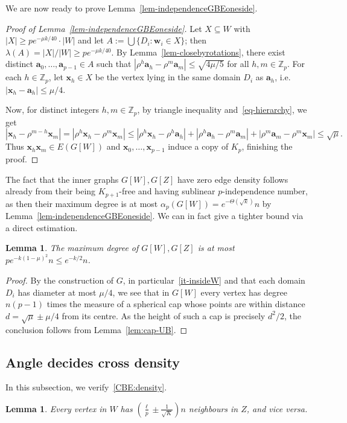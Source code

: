 \documentclass[10pt,a4paper]{article}
\newcommand{\V}[1]{\mathbold{#1}}
\newtheorem{lemma}[theorem]{Lemma}
\theoremstyle{definition}
\newcommand{\sZ}{\mathbb{Z}}
\begin{document}
We are now ready to prove Lemma~\ref{lem-independenceGBEoneside}.
\begin{proof}[Proof of Lemma~\ref{lem-independenceGBEoneside}]
Let $X\subseteq W$ with $|X|\ge pe^{-\mu k/40}\cdot|W|$
	and let $A:=\bigcup\{D_i:\V{w}_i\in X\}$; then $\lambda(A)=|X|/|W|\ge pe^{-\mu k/40}$. By Lemma~\ref{lem-closebyrotations}, there exist distinct $\V{a}_0,\ldots,\V{a}_{p-1}\in A$ such that $|\rho^h\V{a}_h-\rho^m\V{a}_m|\le \sqrt{4\mu/5}$ for all $h,m\in \sZ_p$. For each $h\in \sZ_p$, let $\V{x}_h\in X$ be the vertex lying in the same domain $D_i$ as $\V{a}_h$, i.e. $|\V{x}_h-\V{a}_h|\le \mu/4$. 
	
	Now, for distinct integers $h,m\in \sZ_p$, by triangle inequality and~\eqref{eq-hierarchy}, we get
	\begin{equation*}
		|\V{x}_h-\rho^{m-h}\V{x}_m|=|\rho^h\V{x}_h-\rho^m\V{x}_m|\le |\rho^h\V{x}_h-\rho^h\V{a}_h|+|\rho^h\V{a}_h-\rho^m\V{a}_m|+|\rho^m\V{a}_m-\rho^m\V{x}_m|\le\sqrt{\mu}.
	\end{equation*}
	Thus $\V{x}_h\V{x}_m\in E(G[W])$ and $\V{x}_0,\ldots,\V{x}_{p-1}$ induce a copy of $K_p$, finishing the proof.
\end{proof}

The fact that the inner graphs $G[W],G[Z]$ have zero edge density follows already from their being $K_{p+1}$-free and having sublinear $p$-independence number, as then their maximum degree is at most $\alpha_p(G[W])=e^{-\Theta(\sqrt{k})}n$ by Lemma~\ref{lem-independenceGBEoneside}. We can in fact give a tighter bound via a direct estimation. 
\begin{lemma}\label{lem-maxinsidedeg}
	The maximum degree of $G[W], G[Z]$ is at most $pe^{-k(1-\mu)^2}n\le e^{-k/2}n$. 
\end{lemma}

\begin{proof}
	By the construction of $G$, in particular~\ref{it-insideW} and that each domain $D_i$ has diameter at most $\mu/4$, we see that in $G[W]$ every vertex has degree $n(p-1)$ times the measure of a spherical cap whose points are within distance $d=\sqrt{\mu}\pm \mu/4$ from its centre. As the height of such a cap is precisely $d^2/2$, the conclusion follows from Lemma~\ref{lem:cap-UB}.
\end{proof}




\subsection{Angle decides cross density}
In this subsection, we verify~\ref{CBE:density}.
\begin{lemma}\label{lem-mindegree}
	Every vertex in $W$ has $(\frac{\ell}{p}\pm \frac{1}{\sqrt{K}}) n$  neighbours in $Z$, and vice versa.
\end{lemma}
\end{document}
